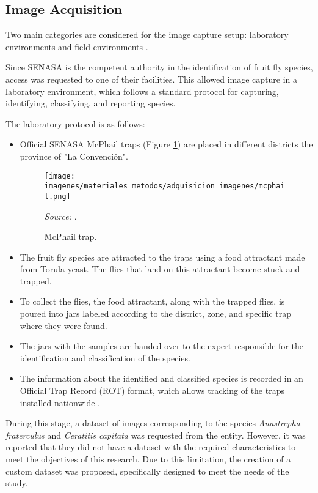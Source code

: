 \subsection{Image Acquisition}
Two main categories are considered for the image capture setup: laboratory environments and field environments \cite{18Martineau2017}.

Since SENASA is the competent authority in the identification of fruit fly species, access was requested to one of their facilities. This allowed image capture in a laboratory environment, which follows a standard protocol for capturing, identifying, classifying, and reporting species.

The laboratory protocol is as follows:
\begin{itemize}
    \item Official SENASA McPhail traps (Figure \ref{fig:multilure}) are placed in different districts the province of "La Convención".
        \begin{figure}[htbp]
            \centering
            \texttt{[image: imagenes/materiales\_metodos/adquisicion\_imagenes/mcphail.png]}
            \caption{McPhail trap.}
            \scriptsize \textit{Source:} \cite{Safer2022}.
            \label{fig:multilure}
        \end{figure}
    \item The fruit fly species are attracted to the traps using a food attractant made from Torula yeast. The flies that land on this attractant become stuck and trapped.
    \item To collect the flies, the food attractant, along with the trapped flies, is poured into jars labeled according to the district, zone, and specific trap where they were found.
    \item The jars with the samples are handed over to the expert responsible for the identification and classification of the species.
    \item The information about the identified and classified species is recorded in an Official Trap Record (ROT) format, which allows tracking of the traps installed nationwide \cite{6senasa_manual_vigilancia}.
\end{itemize}

During this stage, a dataset of images corresponding to the species \textit{Anastrepha fraterculus} and \textit{Ceratitis capitata} was requested from the entity. However, it was reported that they did not have a dataset with the required characteristics to meet the objectives of this research. Due to this limitation, the creation of a custom dataset was proposed, specifically designed to meet the needs of the study.

